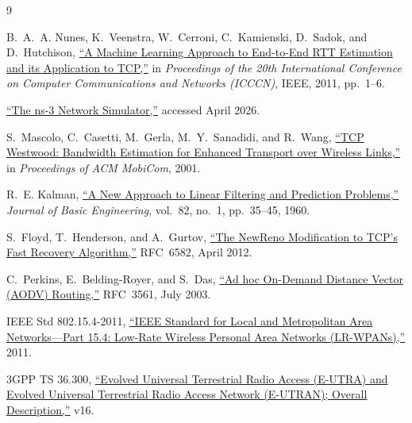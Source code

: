 \documentclass[12pt,a4paper]{article}
\begin{document}
\newpage
\begin{thebibliography}{9}

B.~A.~A. Nunes, K.~Veenstra, W.~Cerroni, C.~Kamienski, D.~Sadok, and D.~Hutchison,
\href{https://doi.org/10.1109/ICCCN.2011.6005933}{``A Machine Learning Approach to End-to-End RTT Estimation and its Application to TCP,''}
in \emph{Proceedings of the 20th International Conference on Computer Communications and Networks (ICCCN)},
IEEE, 2011, pp.~1--6.

\href{https://www.nsnam.org/}{``The ns-3 Network Simulator,''} accessed April 2026.

S.~Mascolo, C.~Casetti, M.~Gerla, M.~Y.~Sanadidi, and R.~Wang,
\href{https://doi.org/10.1145/381677.381693}{``TCP Westwood: Bandwidth Estimation for Enhanced Transport over Wireless Links,''}
in \emph{Proceedings of ACM MobiCom}, 2001.

R.~E. Kalman,
\href{https://doi.org/10.1115/1.3662552}{``A New Approach to Linear Filtering and Prediction Problems,''}
\emph{Journal of Basic Engineering}, vol.~82, no.~1, pp.~35--45, 1960.

S.~Floyd, T.~Henderson, and A.~Gurtov,
\href{https://www.rfc-editor.org/rfc/rfc6582}{``The NewReno Modification to TCP's Fast Recovery Algorithm,''}
RFC~6582, April 2012.

C.~Perkins, E.~Belding-Royer, and S.~Das,
\href{https://www.rfc-editor.org/rfc/rfc3561}{``Ad hoc On-Demand Distance Vector (AODV) Routing,''}
RFC~3561, July 2003.

IEEE Std 802.15.4-2011,
\href{https://doi.org/10.1109/IEEESTD.2011.6012487}{``IEEE Standard for Local and Metropolitan Area Networks---Part 15.4: Low-Rate Wireless Personal Area Networks (LR-WPANs),''} 2011.

3GPP TS 36.300,
\href{https://www.3gpp.org/DynaReport/36300.htm}{``Evolved Universal Terrestrial Radio Access (E-UTRA) and Evolved Universal Terrestrial Radio Access Network (E-UTRAN); Overall Description,''} v16.

\end{thebibliography}
\end{document}
